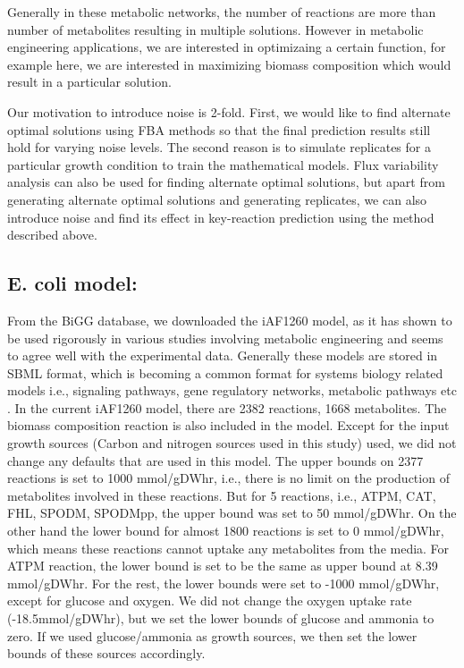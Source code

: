 \documentclass[12pt]{article}
\begin{document}
\bigskip
\noindent
Generally in these metabolic networks, the number of reactions are more than number of metabolites resulting in multiple solutions.  However in metabolic engineering applications, we are interested in optimizaing a certain function, for example here, we are interested in maximizing biomass composition which would result in a particular solution. 

\bigskip
\noindent
Our motivation to introduce noise is 2-fold. First, we would like to find alternate optimal solutions using FBA methods so that the final prediction results still hold for varying noise levels. The second reason is to simulate replicates for a particular growth condition to train the mathematical models. Flux variability analysis can also be used for finding alternate optimal solutions, but apart from generating alternate optimal solutions and generating replicates, we can also introduce noise and find its effect in key-reaction prediction using the method described above.

\subsection*{E. coli model:} 
From the BiGG database, we downloaded the iAF1260 model, as it has shown to be used rigorously in various studies involving metabolic engineering and seems to agree well with the experimental data. Generally these models are stored in SBML format, which is becoming a common format for systems biology related models i.e., signaling pathways, gene regulatory networks, metabolic pathways etc \cite{Huckaetal2003}. In the current iAF1260 model, there are 2382 reactions, 1668 metabolites. The biomass composition reaction is also included in the model. Except for the input growth sources (Carbon and nitrogen sources used in this study) used, we did not change any defaults that are used in this model. The upper bounds on 2377 reactions is set to 1000 mmol/gDWhr, i.e., there is no limit on the production of metabolites involved in these reactions. But for 5 reactions, i.e., ATPM, CAT, FHL, SPODM, SPODMpp, the upper bound was set to 50 mmol/gDWhr. On the other hand the lower bound for almost 1800 reactions is set to 0 mmol/gDWhr, which means these reactions cannot uptake any metabolites from the media. For ATPM reaction, the lower bound is set to be the same as upper bound at 8.39 mmol/gDWhr. For the rest, the lower bounds were set to -1000 mmol/gDWhr, except for glucose and oxygen. We did not change the oxygen uptake rate (-18.5mmol/gDWhr), but we set the lower bounds of glucose and ammonia to zero. If we used glucose/ammonia as growth sources, we then set the lower bounds of these sources accordingly.
\end{document}
